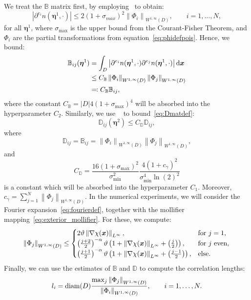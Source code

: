We treat the $\mathbb{B}$ matrix first, by employing~\cite[Lemma~4]{harbrecht2016} to obtain:
\begin{equation*}
    \left|  \partial^{e_i}n(\bm{\eta}^1, \cdot)\right| \leq 2 (1+\sigma_{max})^2 \left\| \Phi_i \right\|_{W^{1,\infty}(D)}, \qquad i=1,\ldots, N,
\end{equation*}
for all $\bm{\eta}^1$, where $\sigma_{\max}$ is the upper bound from the Courant-Fisher Theorem, and $\Phi_i$ are the partial transformations from equation~\eqref{eq:phidefpois}.
Hence, we bound:
\begin{align*}
    \mathbb{B}_{ij}(\bm{\eta}^1) &= \int_D \left| \partial^{e_i} n(\bm{\eta}^1, \cdot)\partial^{e_j} n(\bm{\eta}^1, \cdot)   \right| \mathrm{d}{{\bm{x}}}\\
    & \leq C_{\mathbb{B}} \left\| \Phi_i \right\|_{W^{1,\infty}(D)}  \left\| \Phi_j \right\|_{W^{1,\infty}(D)}\\
    & \eqqcolon C_{\mathbb{B}} \mathbb{B}_{ij},
\end{align*}
where the constant $C_\mathbb{B}=|D|4 (1+\sigma_{\max})^4$ will be absorbed into the hyperparameter $C_2$.
Similarly, we use ~\cite[Theorem~4]{harbrecht2016} to bound~\eqref{eq:Dmatdef}:
\begin{equation*}
    \mathbb{D}_{ij}(\bm{\eta}^2) \leq C_{\mathbb{D}} \mathbb{D}_{ij},
\end{equation*}
where
\begin{equation*}
    \mathbb{D}_{ij}=\mathbb{B}_{ij}=\left\|\Phi_i \right\|_{W^{1,\infty}(D)}  \left\| \Phi_j \right\|_{W^{1,\infty}(D)},
\end{equation*}
and
\begin{equation*}
    C_\mathbb{D}=\frac{16(1+\sigma_{\max})^2 }{\sigma_{\min}^2} \frac{4 (1 + c_\gamma)^2}{\sigma_{\min}^4\ln\left( 2 \right)^2}
\end{equation*}
is a constant which will be absorbed into the hyperparameter $C_1$.
Moreover, $c_\gamma=\sum_{j=1}^N \left\| \Phi_j \right\|_{W^{1,\infty}(D)}$.
In the numerical experiments, we will consider the Fourier expansion~\eqref{eq:fourierdef}, together with the mollifier mapping~\eqref{eq:exterior_mollifier}.
For these, we compute:
\begin{equation}
    \left\| \Phi_j \right\|_{W^{1,\infty}(D)} \leq
    \begin{cases}
        2\vartheta\left\| \nabla \chi({{\bm{x}}}) \right\|_{L^{\infty}} ,& \text{for }j=1,\\
        \left( \frac{j+2}{2} \right)^{-\alpha}\vartheta\left( 1 + \left\| \nabla \chi({{\bm{x}}}) \right\|_{L^{\infty}} + \left( \frac{j}{2} \right)  \right) , & \text{for $j$ even},\\
        \left( \frac{j+1}{2} \right)^{-\alpha}\vartheta\left( 1 + \left\| \nabla \chi({{\bm{x}}}) \right\|_{L^{\infty}} + \left( \frac{j-1}{2} \right) \right) ,& \text{else}.\\
    \end{cases}\label{eq:shapew1infnormdef}
\end{equation}
Finally, we can use the estimates of $\mathbb{B}$ and $\mathbb{D}$ to compute the correlation lengths:
\begin{equation*}
    l_i = \operatorname*{diam}(D) \frac{\max_j \left\| \Phi_j \right\|_{W^{1,\infty}(D)}}{\left\| \Phi_i \right\|_{W^{1,\infty}(D)}}, \qquad i=1,\ldots, N.
\end{equation*}

